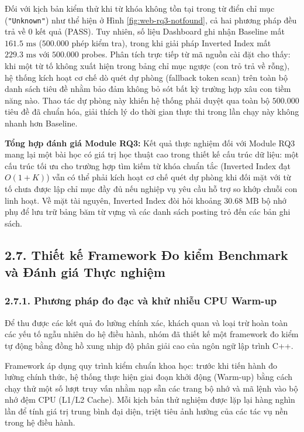 \documentclass[14pt,a4paper]{extarticle}
\begin{document}
Đối với kịch bản kiểm thử khi từ khóa không tồn tại trong từ điển chỉ mục (\texttt{"Unknown"}) như thể hiện ở Hình \ref{fig:web-rq3-notfound}, cả hai phương pháp đều trả về $0$ kết quả (PASS). Tuy nhiên, số liệu Dashboard ghi nhận Baseline mất $161.5\text{ ms}$ ($500.000$ phép kiểm tra), trong khi giải pháp Inverted Index mất $229.3\text{ ms}$ với $500.000$ probes. Phân tích trực tiếp từ mã nguồn cài đặt cho thấy: khi một từ tố không xuất hiện trong bảng chỉ mục ngược (con trỏ trả về rỗng), hệ thống kích hoạt cơ chế dò quét dự phòng (fallback token scan) trên toàn bộ danh sách tiêu đề nhằm bảo đảm không bỏ sót bất kỳ trường hợp xâu con tiềm năng nào. Thao tác dự phòng này khiến hệ thống phải duyệt qua toàn bộ $500.000$ tiêu đề đã chuẩn hóa, giải thích lý do thời gian thực thi trong lần chạy này không nhanh hơn Baseline.

\textbf{Tổng hợp đánh giá Module RQ3:} Kết quả thực nghiệm đối với Module RQ3 mang lại một bài học có giá trị học thuật cao trong thiết kế cấu trúc dữ liệu: một cấu trúc tối ưu cho trường hợp tìm kiếm từ khóa chuẩn tắc (Inverted Index đạt $O(1 + K)$) vẫn có thể phải kích hoạt cơ chế quét dự phòng khi đối mặt với từ tố chưa được lập chỉ mục đầy đủ nếu nghiệp vụ yêu cầu hỗ trợ so khớp chuỗi con linh hoạt. Về mặt tài nguyên, Inverted Index đòi hỏi khoảng $30.68\text{ MB}$ bộ nhớ phụ để lưu trữ bảng băm từ vựng và các danh sách posting trỏ đến các bản ghi sách.

\subsection*{2.7. Thiết kế Framework Đo kiểm Benchmark và Đánh giá Thực nghiệm}

\subsubsection*{2.7.1. Phương pháp đo đạc và khử nhiễu CPU Warm-up}

Để thu được các kết quả đo lường chính xác, khách quan và loại trừ hoàn toàn các yếu tố ngẫu nhiên do hệ điều hành, nhóm đã thiết kế một framework đo kiểm tự động bằng đồng hồ xung nhịp độ phân giải cao của ngôn ngữ lập trình C++.

Framework áp dụng quy trình kiểm chuẩn khoa học: trước khi tiến hành đo lường chính thức, hệ thống thực hiện giai đoạn khởi động (Warm-up) bằng cách chạy thử một số lượt truy vấn nhằm nạp sẵn các trang bộ nhớ và mã lệnh vào bộ nhớ đệm CPU (L1/L2 Cache). Mỗi kịch bản thử nghiệm được lặp lại hàng nghìn lần để tính giá trị trung bình đại diện, triệt tiêu ảnh hưởng của các tác vụ nền trong hệ điều hành.
\end{document}
